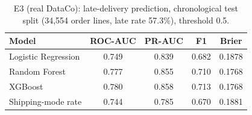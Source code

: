 \begin{table}[t]\centering\caption{E3 (real DataCo): late-delivery prediction, chronological test split (34,554 order lines, late rate 57.3\%), threshold 0.5.}\label{tab:exp3}\scriptsize\setlength{\tabcolsep}{3.5pt}\begin{tabular}{lcccc}\toprule
Model & ROC-AUC & PR-AUC & F1 & Brier\\\midrule
Logistic Regression & 0.749 & 0.839 & 0.682 & 0.1878\\
Random Forest & 0.777 & 0.855 & 0.710 & 0.1768\\
XGBoost & 0.780 & 0.858 & 0.713 & 0.1768\\
Shipping-mode rate & 0.744 & 0.785 & 0.670 & 0.1881\\
\bottomrule\end{tabular}\end{table}
